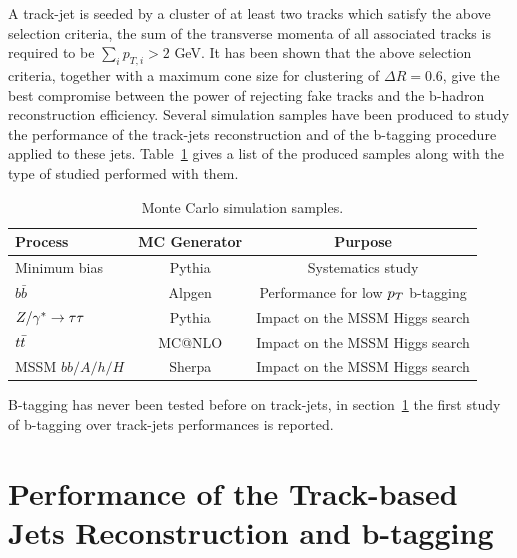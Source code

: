 A track-jet is seeded by a cluster of at least two tracks which satisfy the above selection criteria, 
the sum of the transverse momenta of all associated tracks is required to be $\sum_ip_{T,i} > 2$ GeV.
It has been shown that the above selection criteria, together with a maximum cone size for clustering of 
$\Delta R = 0.6$, give the best compromise between the power of rejecting  fake tracks and the b-hadron reconstruction efficiency.
Several simulation samples have been produced to study the performance of the track-jets reconstruction and of the b-tagging procedure
applied to these jets.
Table~\ref{tab:tackjetSample}  gives a list of the produced samples along with the type of studied performed with them.

\begin{table}[tp]
\centering
	\begin{tabular}{l c c}
	\hline
	\hline
	Process		&	MC Generator 	& Purpose				\\
	\hline
	Minimum bias	& Pythia		& Systematics study 			\\
	$b\bar{b}$ 	& Alpgen		& Performance for low $p_{T}$ b-tagging 	\\
	$Z/\gamma^*\rightarrow \tau\tau$ 	& Pythia		& Impact on the MSSM Higgs search 	\\
	$t\bar{t}$	& MC@NLO		& Impact on the MSSM Higgs search\\
	MSSM $bb/A/h/H$ & Sherpa		& Impact on the MSSM Higgs search \\ 
	\hline
	\hline
	\end{tabular}
	\caption{Monte Carlo simulation samples.}  %
	\label{tab:tackjetSample}
\end{table}
	

B-tagging has never been tested before on track-jets, in section~\ref{sec:tj_perf} the first study of b-tagging over track-jets 
performances is reported. 


\section[Performance of the Track-based Jets]{Performance of the Track-based Jets Reconstruction and b-tagging}\label{sec:tj_perf}
